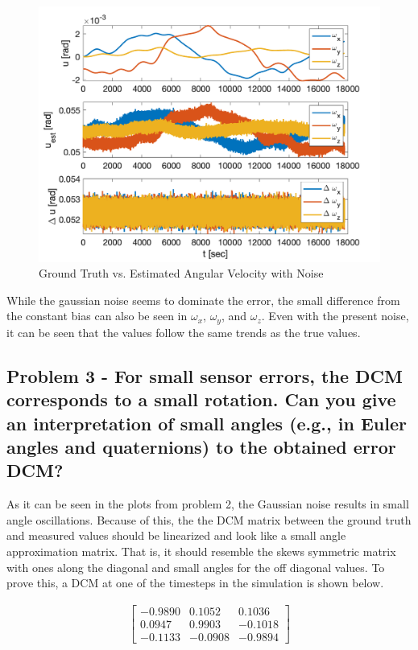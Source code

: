 \begin{figure}[H]
    \centering
    \captionsetup{ justification = centering }
    \includegraphics[width = 12cm]{Images/PS7/obcVsGroundOmegas.png}
    \caption{Ground Truth vs. Estimated Angular Velocity with Noise}
    \label{fig:omega_noise}
\end{figure}

While the gaussian noise seems to dominate the error, the small difference from the constant bias can also be seen in $\omega_x$, $\omega_y$, and $\omega_z$. Even with the present noise, it can be seen that the values follow the same trends as the true values.

\subsection{Problem 3 - For small sensor errors, the DCM corresponds to a small rotation. Can you give an interpretation of small angles (e.g., in Euler angles and quaternions) to the obtained error DCM?}

As it can be seen in the plots from problem 2, the Gaussian noise results in small angle oscillations. Because of this, the the DCM matrix between the ground truth and measured values should be linearized and look like a small angle approximation matrix. That is, it should resemble the skews symmetric matrix with ones along the diagonal and small angles for the off diagonal values. To prove this, a DCM at one of the timesteps in the simulation is shown below.

\begin{align*}
\begin{bmatrix}
    -0.9890   &  0.1052  &  0.1036 \\
    0.0947  &  0.9903  & -0.1018 \\
   -0.1133 &  -0.0908 &  -0.9894
\end{bmatrix}
\end{align*}



